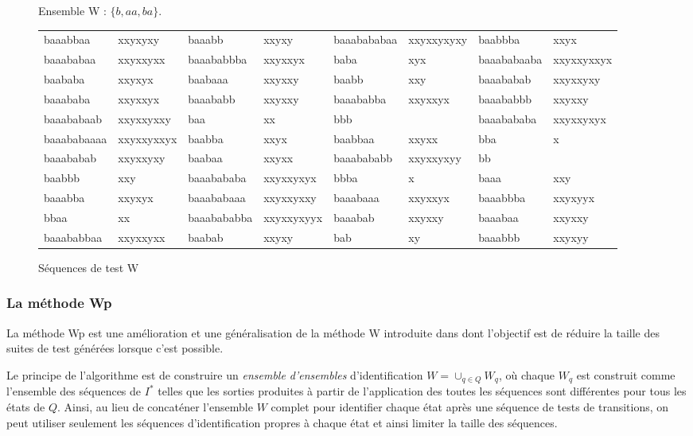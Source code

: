 \begin{figure}
\small 
Ensemble \textsf{W} : $\{b, aa, ba \}$.

\begin{tabular}{|ll|ll|ll|ll|}
\hline
baaabbaa & xxyxyxy &
baaabb & xxyxy &
baaabababaa & xxyxxyxyxy &
baabbba & xxyx \\
baaababaa & xxyxxyxx &
baaababbba & xxyxxyx & 
baba & xyx &
baaababaaba & xxyxxyxxyx \\
baababa & xxyxyx &
baabaaa & xxyxxy  &
baabb & xxy &
baaababab & xxyxxyxy \\
baaababa & xxyxxyx &
baaababb & xxyxxy &
baaababba & xxyxxyx &
baaababbb & xxyxxy \\
baaababaab & xxyxxyxxy &
baa & xx &
bbb &  &
baaabababa & xxyxxyxyx \\
baaababaaaa & xxyxxyxxyx &
baabba & xxyx &
baabbaa & xxyxx &
bba & x \\
baaababab & xxyxxyxy &
baabaa & xxyxx &
baaabababb & xxyxxyxyy &
bb &  \\
baabbb & xxy &
baaabababa & xxyxxyxyx &
bbba & x &
baaa & xxy \\
baaabba & xxyxyx &
baaababaaa & xxyxxyxxy &
baaabaaa & xxyxxyx &
baaabbba & xxyxyyx \\
bbaa & xx &
baaabababba & xxyxxyxyyx &
baaabab & xxyxxy &
baaabaa & xxyxxy \\
baaababbaa & xxyxxyxx &
baabab & xxyxy &
bab & xy &
baaabbb & xxyxyy \\
\hline
\end{tabular}
\caption{S\'equences de test W}
\label{fig-seq-test-w}
\end{figure}

\subsubsection{La m\'ethode \textsf{Wp}}
\label{sec:la-methode-wp}
La m\'ethode \textsf{Wp} est une am\'elioration et une g\'en\'eralisation
de la m\'ethode \textsf{W} introduite dans \cite{fujiwara-test-sel} dont
l'objectif est de r\'eduire la taille des suites de test
g\'en\'er\'ees lorsque c'est possible. 

Le principe de l'algorithme est de construire un \emph{ensemble
d'ensembles} d'identification $W=\cup_{q\in Q}W_q$, o\`u chaque $W_q$
est construit comme l'ensemble des s\'equences de $I^*$ telles que
les sorties produites \`a  partir de l'application des toutes les
s\'equences sont diff\'erentes pour tous les \'etats de $Q$. Ainsi,
au lieu de concat\'ener l'ensemble $W$ complet pour identifier chaque
\'etat apr\`es une s\'equence de tests de transitions, on peut
utiliser seulement les s\'equences d'identification propres \`a
chaque \'etat et ainsi limiter la taille des s\'equences. 

